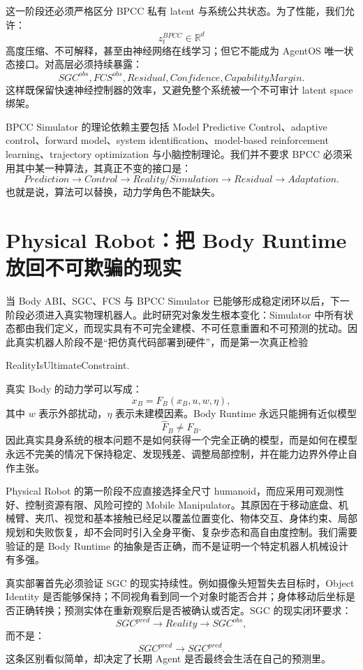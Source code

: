 这一阶段还必须严格区分 BPCC 私有 latent 与系统公共状态。为了性能，我们允许：
\[
z_t^{BPCC}\in\mathbb R^d
\]
高度压缩、不可解释，甚至由神经网络在线学习；但它不能成为 AgentOS 唯一状态接口。对高层必须持续暴露：
\[
SGC^{obs},
FCS^{obs},
Residual,
Confidence,
CapabilityMargin.
\]
这样既保留快速神经控制器的效率，又避免整个系统被一个不可审计 latent space 绑架。

BPCC Simulator 的理论依赖主要包括 Model Predictive Control、adaptive control、forward model、system identification、model-based reinforcement learning、trajectory optimization 与小脑控制理论。我们并不要求 BPCC 必须采用其中某一种算法，其真正不变的接口是：
\[
Prediction
\rightarrow
Control
\rightarrow
Reality/Simulation
\rightarrow
Residual
\rightarrow
Adaptation.
\]
也就是说，算法可以替换，动力学角色不能缺失。

\section{Physical Robot：把 Body Runtime 放回不可欺骗的现实}

当 Body ABI、SGC、FCS 与 BPCC Simulator 已能够形成稳定闭环以后，下一阶段必须进入真实物理机器人。此时研究对象发生根本变化：Simulator 中所有状态都由我们定义，而现实具有不可完全建模、不可任意重置和不可预测的扰动。因此真实机器人阶段不是“把仿真代码部署到硬件”，而是第一次真正检验
\begin{statementbox}
RealityIsUltimateConstraint.
\end{statementbox}

真实 Body 的动力学可以写成：
\[
\dot x_B
=
F_B(x_B,u,w,\eta),
\]
其中 $w$ 表示外部扰动，$\eta$ 表示未建模因素。Body Runtime 永远只能拥有近似模型
\[
\hat F_B\neq F_B.
\]
因此真实具身系统的根本问题不是如何获得一个完全正确的模型，而是如何在模型永远不完美的情况下保持稳定、发现残差、调整局部控制，并在能力边界外停止自作主张。

Physical Robot 的第一阶段不应直接选择全尺寸 humanoid，而应采用可观测性好、控制资源有限、风险可控的 Mobile Manipulator。其原因在于移动底盘、机械臂、夹爪、视觉和基本接触已经足以覆盖位置变化、物体交互、身体约束、局部规划和失败恢复，却不会同时引入全身平衡、复杂步态和高自由度控制。我们需要验证的是 Body Runtime 的抽象是否正确，而不是证明一个特定机器人机械设计有多强。

真实部署首先必须验证 SGC 的现实持续性。例如摄像头短暂失去目标时，Object Identity 是否能够保持；不同视角看到同一个对象时能否合并；身体移动后坐标是否正确转换；预测实体在重新观察后是否被确认或否定。SGC 的现实闭环要求：
\[
SGC^{pred}
\rightarrow
Reality
\rightarrow
SGC^{obs},
\]
而不是：
\[
SGC^{pred}\rightarrow SGC^{pred}.
\]
这条区别看似简单，却决定了长期 Agent 是否最终会生活在自己的预测里。

